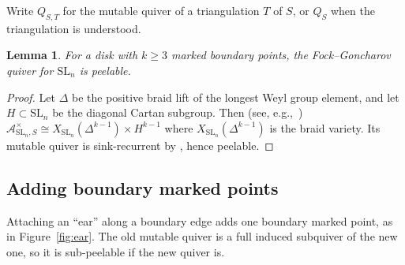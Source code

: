 \documentclass[12pt, letter]{amsart}
\newtheorem{lemma}[theorem]{Lemma}
\theoremstyle{definition}
\newcommand{\Ac}{\mathcal A}
\numberwithin{equation}{section}
\begin{document}
Write $Q_{S,T}$ for the mutable quiver of a triangulation $T$ of $S$,
or $Q_S$ when the triangulation is understood.

\begin{lemma}\label{lem:disks}
For a disk with $k\ge3$ marked boundary points, the
Fock--Goncharov quiver for $\mathrm{SL}_n$ is peelable.
\end{lemma}
\begin{proof}
Let $\Delta$ be the positive braid lift of the longest Weyl group element,
and let $H\subset\mathrm{SL}_n$ be the diagonal Cartan subgroup.
Then (see, e.g.,~\cite[\S 6.2.2]{IOS})
$
 \Ac^\times_{\mathrm{SL}_n,S}
 \cong X_{\mathrm{SL}_n}(\Delta^{k-1})\times H^{k-1}
$
where $X_{\mathrm{SL}_n}(\Delta^{k-1})$ is the braid variety.
Its mutable quiver is sink-recurrent by \cite{CGGLSS, GLSB, COMP},
hence peelable.
\end{proof}


\subsection{Adding boundary marked points}
\label{subsec:ear}
Attaching an ``ear'' along a boundary edge adds one boundary marked point,
as in Figure~\ref{fig:ear}.
The old mutable quiver is a full induced subquiver of the new one,
so it is sub-peelable if the new quiver is.
\end{document}
